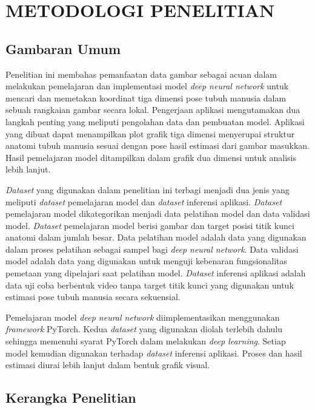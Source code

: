 
\chapter{METODOLOGI PENELITIAN}
\label{cha:3-MetodologiPenelitian}

\section{Gambaran Umum} \label{sec:3-GambaranUmum}

Penelitian ini membahas pemanfaatan data gambar sebagai acuan dalam melakukan pemelajaran dan
implementasi model \textit{deep neural network} untuk mencari dan memetakan koordinat tiga dimensi
pose tubuh manusia dalam sebuah rangkaian gambar secara lokal. Pengerjaan aplikasi mengutamakan dua
langkah penting yang meliputi pengolahan data dan pembuatan model. Aplikasi yang dibuat dapat menampilkan
plot grafik tiga dimensi menyerupai struktur anatomi tubuh manusia sesuai dengan pose hasil
estimasi dari gambar masukkan. Hasil pemelajaran model ditampilkan dalam grafik dua dimensi untuk
analisis lebih lanjut.

\textit{Dataset} yang digunakan dalam penelitian ini terbagi menjadi dua jenis yang meliputi
\textit{dataset} pemelajaran model dan \textit{dataset} inferensi aplikasi.
\textit{Dataset} pemelajaran model dikategorikan menjadi data pelatihan model dan data validasi model.
\textit{Dataset} pemelajaran model berisi gambar dan target posisi titik kunci anatomi dalam jumlah besar.
Data pelatihan model adalah data yang digunakan dalam proses pelatihan sebagai sampel bagi \textit{deep neural network}.
Data validasi model adalah data yang digunakan untuk menguji kebenaran fungsionalitas pemetaan yang
dipelajari saat pelatihan model. \textit{Dataset} inferensi aplikasi adalah data uji coba berbentuk
video tanpa target titik kunci yang digunakan untuk estimasi pose tubuh manusia secara sekuensial.

Pemelajaran model \textit{deep neural network} diimplementasikan menggunakan \textit{framework} PyTorch.
Kedua \textit{dataset} yang digunakan diolah terlebih dahulu sehingga memenuhi syarat PyTorch dalam melakukan
\textit{deep learning}.
Setiap model kemudian digunakan terhadap \textit{dataset} inferensi
aplikasi. Proses dan hasil estimasi diurai lebih lanjut dalam bentuk grafik visual.

\section{Kerangka Penelitian} \label{sec:3-KerangkaPenelitian}

